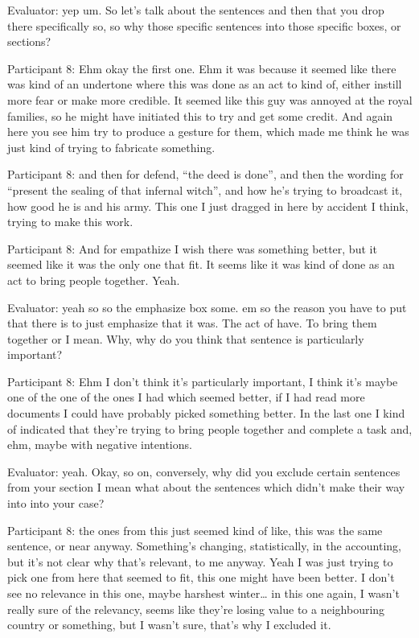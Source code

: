 \documentclass{l4proj}
\begin{document}
\begin{appendices}
Evaluator: yep um. So let's talk about the sentences and then that you drop there specifically so, so why those specific sentences into those specific boxes, or sections?
 
 

Participant 8: Ehm okay the first one. Ehm it was because it seemed like there was kind of an undertone where this was done as an act to kind of, either instill more fear or make more credible. It seemed like this guy was annoyed at the royal families, so he might have initiated this to try and get some credit. And again here you see him try to produce a gesture for them, which made me think he was just kind of trying to fabricate something. 

 

Participant 8: and then for defend, “the deed is done”, and then the wording for “present the sealing of that infernal witch”, and how he’s trying to broadcast it, how good he is and his army. This one I just dragged in here by accident I think, trying to make this work. 

 

Participant 8: And for empathize I wish there was something better, but it seemed like it was the only one that fit. It seems like it was kind of done as an act to bring people together. Yeah. 

Evaluator: yeah so so the emphasize box some. em so the reason you have to put that there is to just emphasize that it was. The act of have. To bring them together or I mean.
Why, why do you think that sentence is particularly important?

Participant 8: Ehm I don't think it's particularly important, I think it's maybe one of the one of the ones I had which seemed better, if I had read more documents I could have probably picked something better. In the last one I kind of indicated that they're trying to bring people together and complete a task and, ehm, maybe with negative intentions. 

Evaluator: yeah. Okay, so on, conversely, why did you exclude certain sentences from your section I mean what about the sentences which didn't make their way into into your case?

Participant 8: the ones from this just seemed kind of like, this was the same sentence, or near anyway. Something’s changing, statistically, in the accounting, but it’s not clear why that’s relevant, to me anyway. Yeah I was just trying to pick one from here that seemed to fit, this one might have been better.  I don’t see no relevance in this one, maybe harshest winter… in this one again, I wasn’t really sure of the relevancy, seems like they’re losing value to a neighbouring country or something, but I wasn’t sure, that’s why I excluded it. 


\end{appendices}
\end{document}
